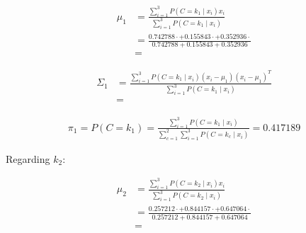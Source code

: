 \documentclass[12pt]{article}
\begin{document}
\begin{enumerate}[leftmargin=\labelsep]
\begin{itemize}[leftmargin=]
                \begin{equation*}
                  \begin{aligned}
                    \mu_1 & = \frac{\sum_{i=1}^3 P(C = k_1 \mid x_i) x_i}{\sum_{i=1}^3 P(C = k_1 \mid x_i)}                                                                                      \\
                          & = \frac{0.742788 \cdot  + 0.155843 \cdot  + 0.352936 \cdot }{0.742788 + 0.155843 + 0.352936} \\
                          & = 
                  \end{aligned}
                \end{equation*}

                \begin{equation*}
                  \begin{aligned}
                    \Sigma_1 & = \frac{\sum_{i=1}^3 P(C = k_1 \mid x_i) (x_{i} - \mu_{1}) (x_{i} - \mu_{1})^T}{\sum_{i=1}^3 P(C = k_1 \mid x_i)} \\
                             & = 
                  \end{aligned}
                \end{equation*}

                \begin{equation*}
                  \begin{aligned}
                    \pi_1 = P(C = k_1) = \frac{\sum_{i=1}^3 P(C = k_1 \mid x_i)}{\sum_{c=1}^2\sum_{i=1}^3 P(C = k_c \mid x_i)} = 0.417189
                  \end{aligned}
                \end{equation*}

                Regarding $k_2$:

                \begin{equation*}
                  \begin{aligned}
                    \mu_2 & = \frac{\sum_{i=1}^3 P(C = k_2 \mid x_i) x_i}{\sum_{i=1}^3 P(C = k_2 \mid x_i)}                                                                                      \\
                          & = \frac{0.257212 \cdot  + 0.844157 \cdot  + 0.647064 \cdot }{0.257212 + 0.844157 + 0.647064} \\
                          & = 
                  \end{aligned}
                \end{equation*}


\end{itemize}
\end{enumerate}
\end{document}
